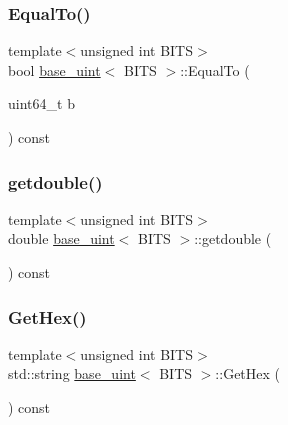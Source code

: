\mbox{\label{classbase__uint_aaba2c27863f6d5077ed21cd353766168}} 
\subsubsection{\texorpdfstring{Equal\+To()}{EqualTo()}}
{\footnotesize\ttfamily template$<$unsigned int B\+I\+TS$>$ \\
bool \mbox{\hyperlink{classbase__uint}{base\+\_\+uint}}$<$ B\+I\+TS $>$\+::Equal\+To (\begin{DoxyParamCaption}\item[{uint64\+\_\+t}]{b }\end{DoxyParamCaption}) const}

\mbox{\label{classbase__uint_ac989d44cd0d60e6c510722a714b817fa}} 
\subsubsection{\texorpdfstring{getdouble()}{getdouble()}}
{\footnotesize\ttfamily template$<$unsigned int B\+I\+TS$>$ \\
double \mbox{\hyperlink{classbase__uint}{base\+\_\+uint}}$<$ B\+I\+TS $>$\+::getdouble (\begin{DoxyParamCaption}{ }\end{DoxyParamCaption}) const}

\mbox{\label{classbase__uint_ae5e7b7481de91ebead20eebd5d685441}} 
\subsubsection{\texorpdfstring{Get\+Hex()}{GetHex()}}
{\footnotesize\ttfamily template$<$unsigned int B\+I\+TS$>$ \\
std\+::string \mbox{\hyperlink{classbase__uint}{base\+\_\+uint}}$<$ B\+I\+TS $>$\+::Get\+Hex (\begin{DoxyParamCaption}{ }\end{DoxyParamCaption}) const}

\mbox{\label{classbase__uint_ad8dbf3216dd15a64f1598344ad7a71ea}} 
